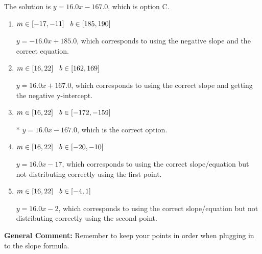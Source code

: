 \documentclass{extbook}[14pt]
\begin{document}
\begin{enumerate}
{The solution is \( y = 16.0x -167.0 \), which is option C.\begin{enumerate}[label=\Alph*.]
\item \( m \in [-17, -11] \hspace*{3mm} b \in [185, 190] \)

 $y = -16.0x + 185.0$, which corresponds to using the negative slope and the correct equation.
\item \( m \in [16, 22] \hspace*{3mm} b \in [162, 169] \)

 $y = 16.0x + 167.0$, which corresponds to using the correct slope and getting the negative y-intercept.
\item \( m \in [16, 22] \hspace*{3mm} b \in [-172, -159] \)

* $y = 16.0x -167.0$, which is the correct option.
\item \( m \in [16, 22] \hspace*{3mm} b \in [-20, -10] \)

 $y = 16.0x -17$, which corresponds to using the correct slope/equation but not distributing correctly using the first point.
\item \( m \in [16, 22] \hspace*{3mm} b \in [-4, 1] \)

 $y = 16.0x -2$, which corresponds to using the correct slope/equation but not distributing correctly using the second point.
\end{enumerate}

\textbf{General Comment:} Remember to keep your points in order when plugging in to the slope formula.
}
\end{enumerate}
\end{document}
